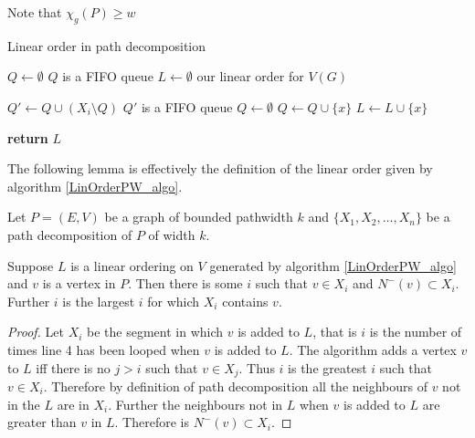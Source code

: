 Note that $\chi_g(P) \geq w$

\begin{algorithm}[h]
    \caption{Linear order in path decomposition}
    \label{LinOrderPW_algo}
    \begin{algorithmic}[1]
        
        
            \State $Q \gets \emptyset$ \Comment $Q$ is a FIFO queue
            \State $L \gets \emptyset$ \Comment our linear order for $V(G)$
           
                \State $Q' \gets Q \cup (X_i\setminus Q)$ \Comment $Q'$ is a FIFO queue
                \State $Q \gets \emptyset$
                        \State $Q \gets Q\cup \{x\}$
                    \Else 
                        \State $L \gets L\cup \{x\}$   
                    \EndIf    
            \EndFor
           
            \EndFor 
            \State \textbf{return}  $L$
       \EndFunction 
    \end{algorithmic}
\end{algorithm}

The following lemma is effectively the definition of the linear order given by algorithm \ref{LinOrderPW_algo}. 

\begin{lemma} \label{neighboursAfter}
    Let $P=(E,V)$ be a graph of bounded pathwidth $k$ and $\{X_1,X_2,\dots,X_n\}$ be a path decomposition of $P$ of width $k$.
    
    Suppose $L$ is a linear ordering on $V$ generated by algorithm \ref{LinOrderPW_algo} and $v$ is a vertex in $P$. Then there is some $i$ such that $v\in X_i$ and $N^-(v) \subset X_i$. Further $i$ is the largest $i$ for which $X_i$ contains $v$. 
\end{lemma}

\begin{proof}
    Let $X_i$ be the segment in which $v$ is added to $L$, that is $i$ is the number of times line 4 has been looped when $v$ is added to $L$.  
    The algorithm adds a vertex $v$ to $L$ iff there is no $j> i$ such that $v \in X_j$. Thus $i$ is the greatest $i$ such that $v \in X_i$. Therefore by definition of path decomposition all the neighbours of $v$ not in the $L$ are in $X_i$. Further the neighbours not in $L$ when $v$ is added to $L$ are greater than $v$ in $L$. Therefore is $N^-(v) \subset X_i$.
\end{proof}

